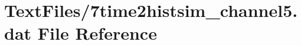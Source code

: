 \hypertarget{7time2histsim__channel5_8dat}{}\section{Text\+Files/7time2histsim\+\_\+channel5.dat File Reference}
\label{7time2histsim__channel5_8dat}
